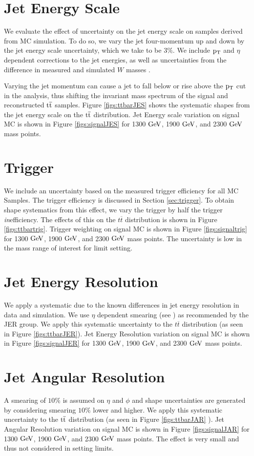 \section{Jet Energy Scale}
We evaluate the effect of uncertainty on the jet energy scale on samples derived from MC simulation.  
To do so, we vary the jet four-momentum up and down by the jet energy 
scale uncertainty, which we take to be $3\%$. We include $\mathrm{p_{T}}$ and $\eta$ dependent corrections to the 
jet energies, as well as uncertainties from the difference in measured and simulated $W$ masses \cite{ZP8TeV}. 

Varying the jet momentum can cause a jet to fall below or rise above the $\mathrm{p_{T}}$ cut in the analysis, thus shifting the invariant 
mass spectrum of the signal and reconstructed $\mathrm{t\overline{t}}$ samples. Figure \ref{figs:ttbarJES} shows the systematic shapes from the 
jet energy scale on the $\mathrm{t\overline{t}}$ distribution.  Jet Energy scale variation on signal MC is shown in Figure \ref{figs:signalJES} for 1300$~\mathrm{GeV}$,
 1900$~\mathrm{GeV}$, and 2300$~\mathrm{GeV}$ mass points.

\section{Trigger}
We include an uncertainty based on the measured trigger efficiency for all MC Samples. The trigger efficiency is discussed in Section \ref{sec:trigger}. 
To obtain shape systematics from this effect, we vary the trigger by half the trigger \textit{in}efficiency. The effects of this on the $t\overline{t}$ 
distribution is shown in Figure \ref{figs:ttbartrig}. Trigger weighting on signal MC is shown in Figure \ref{figs:signaltrig} for 1300$~\mathrm{GeV}$,
 1900$~\mathrm{GeV}$, and 2300$~\mathrm{GeV}$ mass points.  The uncertainty is low in the mass range of interest for limit setting.

\section{Jet Energy Resolution}
\label{sec:JER}
We apply a systematic due to the known differences in jet energy resolution in data and simulation.  We use $\eta$ dependent smearing (see \cite{ZP8TeV}) as recommended by the JER group.  
We apply this systematic uncertainty to the $t\overline{t}$ distribution 
(as seen in Figure \ref{figs:ttbarJER}).  Jet Energy Resolution variation on signal MC is shown in Figure \ref{figs:signalJER} for 1300$~\mathrm{GeV}$,
 1900$~\mathrm{GeV}$, and 2300$~\mathrm{GeV}$ mass points. 

\section{Jet Angular Resolution}
A smearing of $10\%$ is assumed on $\eta$ and $\phi$ and shape uncertainties are generated by considering smearing $10\%$ 
lower and higher. We apply this systematic uncertainty to the $\mathrm{t\overline{t}}$ distribution (as seen in Figure \ref{figs:ttbarJAR} ). Jet Angular Resolution 
variation on signal MC is shown in Figure \ref{figs:signalJAR} for 1300$~\mathrm{GeV}$,
 1900$~\mathrm{GeV}$, and 2300$~\mathrm{GeV}$ mass points.  The effect is very small and thus not considered in setting limits.

